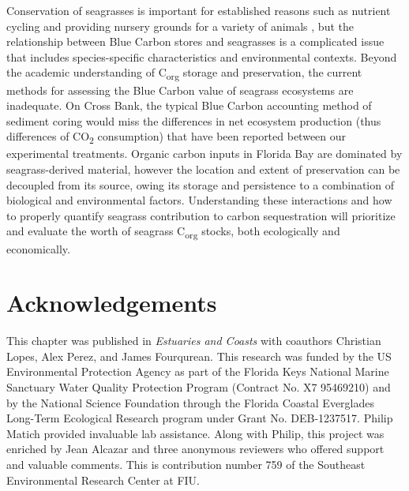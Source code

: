Conservation of seagrasses is important for established reasons such as nutrient cycling and providing nursery grounds for a variety of animals \citep{Costanza:2014ex, Hejnowicz:2015fa}, but the relationship between Blue Carbon stores and seagrasses is a complicated issue that includes species-specific characteristics and environmental contexts. Beyond the academic understanding of C\textsubscript{org} storage and preservation, the current methods for assessing the Blue Carbon value of seagrass ecosystems are inadequate. On Cross Bank, the typical Blue Carbon accounting method of sediment coring would miss the differences in net ecosystem production (thus differences of CO\textsubscript{2} consumption) that have been reported between our experimental treatments. Organic carbon inputs in Florida Bay are dominated by seagrass-derived material, however the location and extent of preservation can be decoupled from its source, owing its storage and persistence to a combination of biological and environmental factors. Understanding these interactions and how to properly quantify seagrass contribution to carbon sequestration will prioritize and evaluate the worth of seagrass C\textsubscript{org} stocks, both ecologically and economically.


\section{Acknowledgements}

This chapter was published in \textit{Estuaries and Coasts} with coauthors Christian Lopes, Alex Perez, and James Fourqurean. This research was funded by the US Environmental Protection Agency as part of the Florida Keys National Marine Sanctuary Water Quality Protection Program (Contract No. X7 95469210) and by the National Science Foundation through the Florida Coastal Everglades Long-Term Ecological Research program under Grant No. DEB-1237517. Philip Matich provided invaluable lab assistance. Along with Philip, this project was enriched by Jean Alcazar and three anonymous reviewers who offered support and valuable comments. This is contribution number 759 of the Southeast Environmental Research Center at FIU.

\section{}
\begingroup

\setlength{\bibsep}{10pt}
\linespread{1}\selectfont

